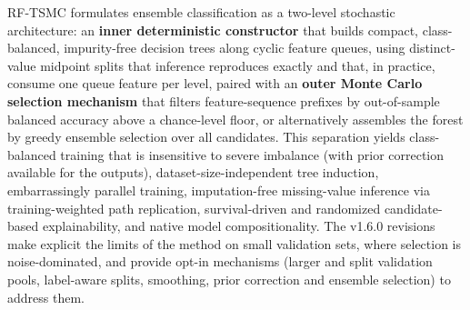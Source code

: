 \documentclass[11pt,a4paper]{article}
\begin{document}
RF-TSMC formulates ensemble classification as a two-level stochastic architecture: an \textbf{inner deterministic constructor} that builds compact, class-balanced, impurity-free decision trees along cyclic feature queues, using distinct-value midpoint splits that inference reproduces exactly and that, in practice, consume one queue feature per level, paired with an \textbf{outer Monte Carlo selection mechanism} that filters feature-sequence prefixes by out-of-sample balanced accuracy above a chance-level floor, or alternatively assembles the forest by greedy ensemble selection over all candidates. This separation yields class-balanced training that is insensitive to severe imbalance (with prior correction available for the outputs), dataset-size-independent tree induction, embarrassingly parallel training, imputation-free missing-value inference via training-weighted path replication, survival-driven and randomized candidate-based explainability, and native model compositionality. The v1.6.0 revisions make explicit the limits of the method on small validation sets, where selection is noise-dominated, and provide opt-in mechanisms (larger and split validation pools, label-aware splits, smoothing, prior correction and ensemble selection) to address them.
\end{document}
